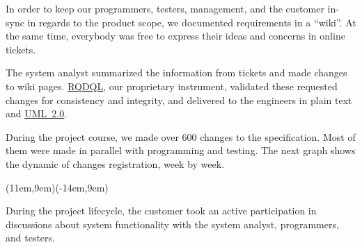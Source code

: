 \documentclass[12pt,letterpaper,oneside]{article}
\newcommand{\enru}[2]{#1}
\begin{document}
    \enru{
        In order to keep our programmers, testers, management, and the customer
        in-sync in regards to the product scope, we documented
        requirements in a ``wiki''. At the same time, everybody was free to express
        their ideas and concerns in online tickets.
    }{
        Для того, чтобы синхронизировать программистов, тестеров, менеджеров
        и клиента относительно того, что мы разрабатываем, мы стали
        документировать требования к системе (``Техническое Задание'') в ``wiki''. В то же
        время все получили возможность выражать свои идеи и критику через
        систему ``тикетов''.
    }

    

    \enru{
        The system analyst
        summarized the information from tickets and made changes to
        wiki pages. \href{http://www.rqdql.com}{RQDQL},
        our proprietary instrument, validated these
        requested changes for consistency and integrity,
        and delivered to the engineers in plain text and \href{http://www.omg.org/spec/UML/2.0/}{UML~2.0}.
    }{
        Аналитик суммировал информацию из тикетов и делал изменения в wiki страницах.
        \href{http://www.rqdql.com}{RQDQL}, система нашей разработки, проверяла
        требования на лету на предмет целостности и не-конфликтности и
        передавала их инженерам в текстовом формате и в \href{http://www.omg.org/spec/UML/2.0/}{UML~2.0}.
    }

    \enru{
        During the project course, we made over 600 changes to
        the specification. Most of them were made in parallel
        with programming and testing. The next graph shows the
        dynamic of changes registration, week by week.
    }{
        За все время работы над проектом мы сделали более 600 изменений
        в техническом задании. Большинство изменений было сделано
        параллельно с программирование и тестированием. На графике
        видна динамика количества изменений, понедельно.
    }

    \parpic(11em,9em)(-14em,9em){}

    \enru{
        During the project lifecycle, the customer took
        an active participation in discussions about system
        functionality with the system analyst, programmers, and testers.
    }{
        Во время всего проекта заказчик принимал активное участие
        в обсуждении функциональности ситемы, вместе с аналитиком, программистами
        и тестерами.
    }
\end{document}
